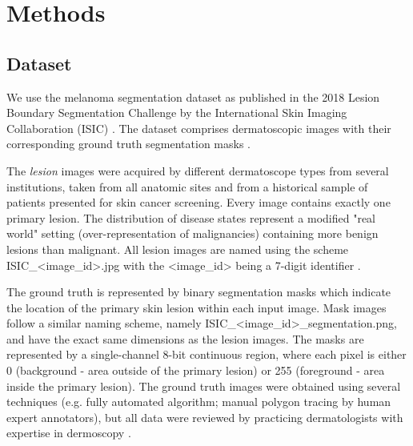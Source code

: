 \section{Methods}

\subsection{Dataset}
We use the melanoma segmentation dataset as published in the 2018 Lesion Boundary Segmentation Challenge by the International Skin Imaging Collaboration (ISIC) \citep{isic-2018-segmentation}. The dataset comprises dermatoscopic images with their corresponding ground truth segmentation masks \citep{ensambles-2016-codella}.

\par
The \emph{lesion} images were acquired by different dermatoscope types from several institutions, taken from all anatomic sites and from a historical sample of patients presented for skin cancer screening. Every image contains exactly one primary lesion. The distribution of disease states represent a modified "real world" setting (over-representation of malignancies) containing more benign lesions than malignant. All lesion images are named using the scheme ISIC\_\textless{image}\_id\textgreater{.jpg} with the \textless{image}\_id\textgreater{} being a 7-digit identifier \citep{isic-2018-segmentation}.

\par
The ground truth is represented by binary segmentation masks which indicate the location of the primary skin lesion within each input image. Mask images follow a similar naming scheme, namely  ISIC\_\textless{image\_id}\textgreater{\_segmentation.png}, and have the exact same dimensions as the lesion images. The masks are represented by a single-channel 8-bit continuous region, where each pixel is either 0 (background - area outside of the primary lesion) or 255 (foreground - area inside the primary lesion). The ground truth images were obtained using several techniques (e.g. fully automated algorithm; manual polygon tracing by human expert annotators), but all data were reviewed by practicing dermatologists with expertise in dermoscopy \citep{isic-2018-segmentation,ensambles-2016-codella}.

